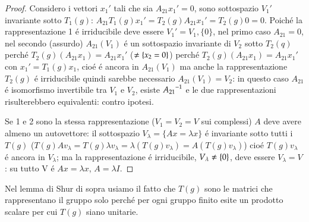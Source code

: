 \documentclass[oneside,12pt]{memoir}
\begin{document}
\begin{proof}
Considero i vettori $x_1'$ tali che sia $A_{21}x_1'=0$, sono sottospazio $V_1'$ invariante sotto $T_1(g)$: $A_{21}T_1(g)x_1'=T_2(g)A_{21}x_1'=T_2(g)0=0$. Poich\'e la rappresentazione 1 \'e irriducibile deve essere $V_1'=V_1,\{0\}$, nel primo caso $A_{21}=0$, nel secondo (assurdo) $A_{21}(V_1)$ \'e un sottospazio invariante di $V_2$ sotto $T_2(q)$ perch\'e $T_2(g)(A_{21}x_1)=A_{21}x_1'$ ($\neq\{x_2=0\}$) perch\'e $T_2(g)(A_{21}x_1)=A_{21}x_1'$ con $x_1'=T_1(g)x_1$, cio\'e \'e ancora in $A_{21}(V_1)$ ma anche la rappresentazione $T_2(g)$ \'e irriducibile quindi sarebbe necessario $A_{21}(V_1)=V_2$: in questo caso $A_{21}$ \'e isomorfismo invertibile tra $V_1$ e $V_2$, esiste ${{A_{21}}^{-1}}$ e le due rappresentazioni risulterebbero equivalenti: contro ipotesi.

Se 1 e 2 sono la stessa rappresentazione ($V_1=V_2=V$ sui complessi) $A$ deve avere almeno un autovettore: il sottospazio $V_{\lambda}=\{Ax=\lambda x\}$ \'e invariante sotto tutti i $T(g)$ ($T(g)Av_{\lambda}=T(g)\lambda v_{\lambda}=\lambda(T(g)v_{\lambda})=A(T(g)v_{\lambda})$) cio\'e $T(g)v_{\lambda}$ \'e ancora in $V_{\lambda}$; ma la rappresentazione \'e irriducibile, $V_{\lambda}\neq\{0\}$, deve essere $V_{\lambda}=V$: su tutto V \'e $Ax=\lambda x$, $A=\lambda I$.
\end{proof}

Nel lemma di Shur di sopra usiamo il fatto che $T(g)$ sono le matrici che rappresentano il gruppo solo perch\'e per ogni gruppo finito esite un prodotto scalare per cui $T(g)$ siano unitarie.
\end{document}
